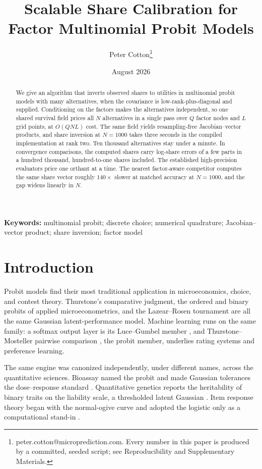 \documentclass[12pt]{article}
\title{Scalable Share Calibration for\\ Factor Multinomial Probit Models}
\author{Peter Cotton\thanks{peter.cotton@microprediction.com. Every
number in this paper is produced by a committed, seeded script; see
Reproducibility and Supplementary Materials.}}
\date{August 2026}
\theoremstyle{remark}
\begin{document}
\maketitle

\begin{abstract}
We give an algorithm that inverts observed shares to utilities in
multinomial probit models with many alternatives, when the covariance
is low-rank-plus-diagonal and supplied. Conditioning on the factors
makes the alternatives independent, so one shared survival field prices
all $N$ alternatives in a single pass over $Q$ factor nodes and $L$
grid points, at $O(QNL)$ cost. The same field yields resampling-free
Jacobian--vector products, and share inversion at $N = 1000$ takes
three seconds in the compiled implementation at rank two. Ten thousand
alternatives stay under a minute. In convergence comparisons, the
computed shares carry log-share errors of a few parts in a hundred
thousand, hundred-to-one shares included. The established
high-precision evaluators price one orthant at a time. The nearest
factor-aware competitor computes the same share vector roughly
$140\times$ slower at matched accuracy at $N = 1000$, and the gap
widens linearly in $N$.
\end{abstract}

\noindent\textbf{Keywords:} multinomial probit; discrete choice;
numerical quadrature; Jacobian--vector product; share inversion; factor
model

\section{Introduction}

Probit models find their most traditional application in microeconomics, choice, and contest theory. 
Thurstone's comparative judgment, the ordered and binary probits of applied
microeconometrics, and the Lazear--Rosen tournament
\citep{lazear1981} are all the same
Gaussian latent-performance model. Machine learning runs on the same
family: a softmax output layer is its Luce--Gumbel member
\citep{luce1959,yellott1977}, and
Thurstone--Mosteller pairwise comparison \citep{mosteller1951}, the
probit member, underlies
rating systems and preference learning.

The same engine was canonized independently, under different names,
across the quantitative sciences. Bioassay named the probit and made
Gaussian tolerances the dose--response standard
\citep{bliss1934,finney1947}. Quantitative genetics reports the
heritability of binary traits on the liability scale, a thresholded
latent Gaussian \citep{dempster1950,falconer1965}. Item response theory
began with the normal-ogive curve and adopted the logistic only as a
computational stand-in \citep{lord1952}.
\end{document}
